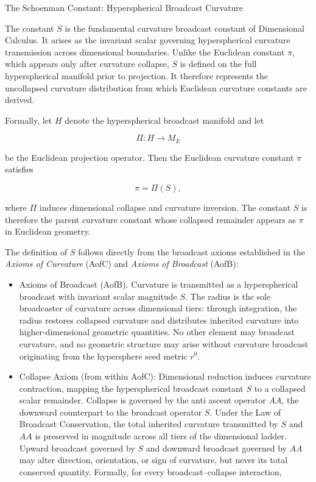 \documentclass[final,onefignum,onetabnum]{siamart}
\begin{document}
\begin{section}{The Schoenman Constant: Hyperspherical Broadcast Curvature}

The constant $S$ is the fundamental curvature broadcast constant of Dimensional Calculus. It arises as the invariant scalar governing hyperspherical curvature transmission across dimensional boundaries. Unlike the Euclidean constant $\pi$, which appears only after curvature collapse, $S$ is defined on the full hyperspherical manifold prior to projection. It therefore represents the uncollapsed curvature distribution from which Euclidean curvature constants are derived.

Formally, let $H$ denote the hyperspherical broadcast manifold and let


\[
\Pi : H \longrightarrow M_{E}
\]


be the Euclidean projection operator. Then the Euclidean curvature constant $\pi$ satisfies


\[
\pi = \Pi(S),
\]


where $\Pi$ induces dimensional collapse and curvature inversion. The constant $S$ is therefore the parent curvature constant whose collapsed remainder appears as $\pi$ in Euclidean geometry.

The definition of $S$ follows directly from the broadcast axioms established in the \textit{Axioms of Curvature} (AofC) and \textit{Axioms of Broadcast} (AofB):

\begin{itemize}
    \item Axioms of Broadcast (AofB). Curvature is transmitted as a hyperspherical broadcast with invariant scalar magnitude $S$. The radius is the sole broadcaster of curvature across dimensional tiers: through integration, the radius restores collapsed curvature and distributes inherited curvature into higher-dimensional geometric quantities. No other element may broadcast curvature, and no geometric structure may arise without curvature broadcast originating from the hypersphere seed metric $r^0$.
    \item Collapse Axiom (from within AofC): Dimensional reduction induces curvature contraction, mapping the hyperspherical broadcast constant $S$ to a collapsed scalar remainder. Collapse is governed by the anti ascent operator $AA$, the downward counterpart to the broadcast operator $S$. Under the Law of Broadcast Conservation, the total inherited curvature transmitted by $S$ and $AA$ is preserved in magnitude across all tiers of the dimensional ladder. Upward broadcast governed by $S$ and downward broadcast governed by $AA$ may alter direction, orientation, or sign of curvature, but never its total conserved quantity. Formally, for every broadcast--collapse interaction,



\end{itemize}
\end{section}
\end{document}
